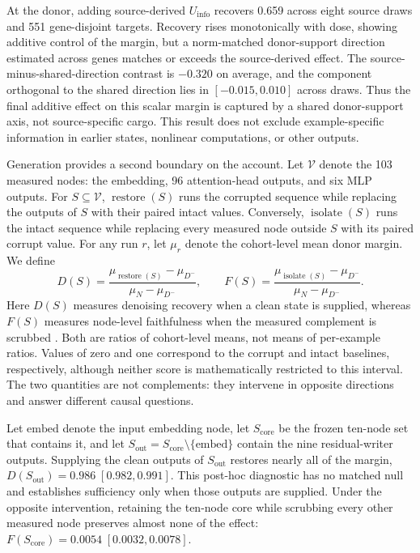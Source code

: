 \documentclass{article}
\newcommand{\Uinfo}{\ensuremath{U_{\mathrm{info}}}}
\begin{document}
At the donor, adding source-derived \Uinfo{} recovers 0.659 across eight source draws and 551 gene-disjoint targets. Recovery rises monotonically with dose, showing additive control of the margin, but a norm-matched donor-support direction estimated across genes matches or exceeds the source-derived effect. The source-minus-shared-direction contrast is \(-0.320\) on average, and the component orthogonal to the shared direction lies in \([-0.015,0.010]\) across draws. Thus the final additive effect on this scalar margin is captured by a shared donor-support axis, not source-specific cargo. This result does not exclude example-specific information in earlier states, nonlinear computations, or other outputs.

Generation provides a second boundary on the account. Let \(\mathcal{V}\) denote the 103 measured nodes: the embedding, 96 attention-head outputs, and six MLP outputs. For \(S\subseteq\mathcal{V}\), \(\operatorname{restore}(S)\) runs the corrupted sequence while replacing the outputs of \(S\) with their paired intact values. Conversely, \(\operatorname{isolate}(S)\) runs the intact sequence while replacing every measured node outside \(S\) with its paired corrupt value. For any run \(r\), let \(\mu_r\) denote the cohort-level mean donor margin. We define
\begin{equation}
D(S)=
\frac{\mu_{\operatorname{restore}(S)}-\mu_{D^-}}
     {\mu_N-\mu_{D^-}},
\qquad
F(S)=
\frac{\mu_{\operatorname{isolate}(S)}-\mu_{D^-}}
     {\mu_N-\mu_{D^-}} .
\label{eq:denoising_faithfulness}
\end{equation}
Here \(D(S)\) measures denoising recovery when a clean state is supplied, whereas \(F(S)\) measures node-level faithfulness when the measured complement is scrubbed \citep{chan2022causalscrubbing,zhang2024patching,hanna2024faithfulness,mueller2025mib}. Both are ratios of cohort-level means, not means of per-example ratios. Values of zero and one correspond to the corrupt and intact baselines, respectively, although neither score is mathematically restricted to this interval. The two quantities are not complements: they intervene in opposite directions and answer different causal questions.

Let \(\mathrm{embed}\) denote the input embedding node, let \(S_{\mathrm{core}}\) be the frozen ten-node set that contains it, and let \(S_{\mathrm{out}}=S_{\mathrm{core}}\setminus\{\mathrm{embed}\}\) contain the nine residual-writer outputs. Supplying the clean outputs of \(S_{\mathrm{out}}\) restores nearly all of the margin, \(D(S_{\mathrm{out}})=0.986\;[0.982,0.991]\). This post-hoc diagnostic has no matched null and establishes sufficiency only when those outputs are supplied. Under the opposite intervention, retaining the ten-node core while scrubbing every other measured node preserves almost none of the effect: \(F(S_{\mathrm{core}})=0.0054\;[0.0032,0.0078]\).
\end{document}
